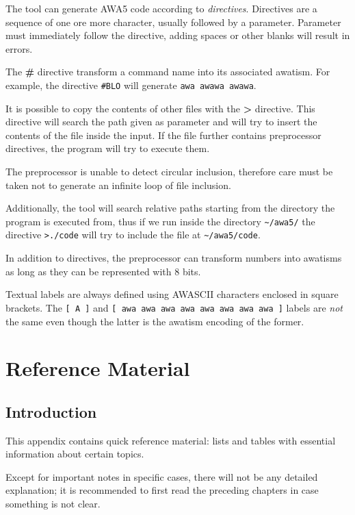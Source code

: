 \documentclass[11pt,a4paper,draft]{book}
\begin{document}
The tool can generate AWA5 code according to
\emph{directives}. Directives are a sequence of one ore more
character, usually followed by a parameter. Parameter must immediately
follow the directive, adding spaces or other blanks will result in
errors.

The \textbf{\#} directive transform a command name into its associated
awatism. For example, the directive \verb|#BLO| will generate
\verb|awa awawa awawa|.

It is possible to copy the contents of other files with the \textbf{>}
directive. This directive will search the path given as parameter and
will try to insert the contents of the file inside the input. If the
file further contains preprocessor directives, the program will try to
execute them.

The preprocessor is unable to detect circular inclusion, therefore
care must be taken not to generate an infinite loop of file inclusion.

Additionally, the tool will search relative paths starting from the
directory the program is executed from, thus if we run inside the
directory \verb|~/awa5/| the directive \verb|>./code| will try to
include the file at \verb|~/awa5/code|.

In addition to directives, the preprocessor can transform numbers into
awa\-tisms as long as they can be represented with \num{8} bits.

Textual labels are always defined using AWASCII characters enclosed in
square brackets. The \verb|[ A ]| and
\verb|[ awa awa awa awa awa awa awa awa ]| labels are \emph{not} the
same even though the latter is the awatism encoding of the former.

\appendix
\chapter{Reference Material}
\section{Introduction}
This appendix contains quick reference material: lists and tables with
essential information about certain topics.

Except for important notes in specific cases, there will not be any
detailed explanation; it is recommended to first read the preceding
chapters in case something is not clear.
\end{document}

